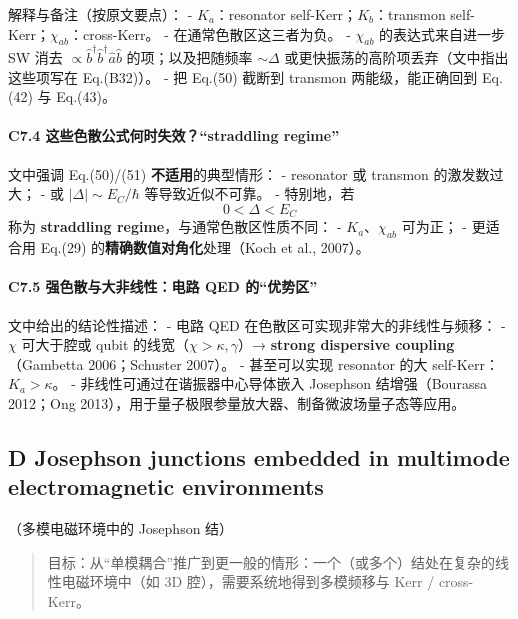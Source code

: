 \documentclass[12pt,a4paper,oneside]{ctexbook}
\let\oldparagraph\paragraph
\renewcommand{\paragraph}[1]{\oldparagraph{#1}\mbox{}}
\begin{document}
解释与备注（按原文要点）： - \(K_a\)：resonator
self-Kerr；\(K_b\)：transmon self-Kerr；\(\chi_{ab}\)：cross-Kerr。 -
在通常色散区这三者为负。 - \(\chi_{ab}\) 的表达式来自进一步 SW 消去
\(\propto \hat b^\dagger\hat b^\dagger\hat a\hat b\) 的项；以及把随频率
\(\sim\Delta\) 或更快振荡的高阶项丢弃（文中指出这些项写在 Eq.(B32)）。 -
把 Eq.(50) 截断到 transmon 两能级，能正确回到 Eq.(42) 与 Eq.(43)。

\paragraph{\texorpdfstring{\textbf{C7.4
这些色散公式何时失效？``straddling
regime''}}{C7.4 这些色散公式何时失效？``straddling regime''}}\label{c7.4-ux8fd9ux4e9bux8272ux6563ux516cux5f0fux4f55ux65f6ux5931ux6548straddling-regime}

文中强调 Eq.(50)/(51) \textbf{不适用}的典型情形： - resonator 或
transmon 的激发数过大； - 或 \(|\Delta|\sim E_C/\hbar\)
等导致近似不可靠。 - 特别地，若 \[
  0<\Delta<E_C
  \] 称为 \textbf{straddling regime}，与通常色散区性质不同： -
\(K_a\)、\(\chi_{ab}\) 可为正； - 更适合用 Eq.(29)
的\textbf{精确数值对角化}处理（Koch et al., 2007）。

\paragraph{\texorpdfstring{\textbf{C7.5 强色散与大非线性：电路 QED
的``优势区''}}{C7.5 强色散与大非线性：电路 QED 的``优势区''}}\label{c7.5-ux5f3aux8272ux6563ux4e0eux5927ux975eux7ebfux6027ux7535ux8def-qed-ux7684ux4f18ux52bfux533a}

文中给出的结论性描述： - 电路 QED 在色散区可实现非常大的非线性与频移： -
\(\chi\) 可大于腔或 qubit 的线宽（\(\chi>\kappa,\gamma\)）→
\textbf{strong dispersive coupling}（Gambetta 2006；Schuster 2007）。 -
甚至可以实现 resonator 的大 self-Kerr：\(K_a>\kappa\)。 -
非线性可通过在谐振器中心导体嵌入 Josephson 结增强（Bourassa 2012；Ong
2013），用于量子极限参量放大器、制备微波场量子态等应用。


\subsection{D Josephson junctions embedded
in multimode electromagnetic
environments}
（多模电磁环境中的 Josephson 结）

\begin{quote}
目标：从``单模耦合''推广到更一般的情形：一个（或多个）结处在复杂的线性电磁环境中（如
3D 腔），需要系统地得到多模频移与 Kerr / cross-Kerr。
\end{quote}
\end{document}
